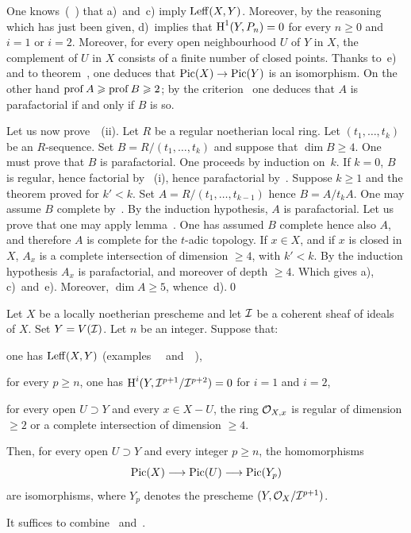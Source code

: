 One knows~(~) that a)~and~c) imply $\operatorname{Leff}(X, Y)$. Moreover, by the reasoning which has just been given, d)~implies that $\operatorname{H}^1(Y, P_n)=0$ for every $n\geq 0$ and $i=1$ or $i=2$. Moreover, for every open neighbourhood $U$ of $Y$ in $X$, the complement of $U$ in $X$ consists of a finite number of closed points. Thanks to~e) and to theorem~, one deduces that $\Pic(X)\to \Pic(Y)$ is an isomorphism. On the other hand $\operatorname{prof} A\geqslant \operatorname{prof} B\geqslant 2$; by the criterion~ one deduces that $A$ is parafactorial if and only if $B$ is so.

Let us now prove~~(ii). Let $R$ be a regular noetherian local ring. Let $(t_1, \ldots, t_k)$ be an $R$-sequence. Set $B=R/(t_1, \ldots, t_k)$ and suppose that $\dim B\geq 4$. One must prove that $B$ is parafactorial. One proceeds by induction on~$k$. If $k=0$, $B$ is regular, hence factorial by ~(i), hence parafactorial by~. Suppose $k\geq 1$ and the theorem proved for $k'<k$. Set $A=R/(t_1, \ldots, t_{k-1})$ hence $B=A/t_k A$. One may assume $B$ complete by~. By the induction hypothesis, $A$ is parafactorial. Let us prove that one may apply lemma~. One has assumed $B$ complete hence also $A$, and therefore $A$ is complete for the $t$-adic topology. If $x\in X$, and if $x$ is closed in $X$, $A_x$ is a complete intersection of dimension $\geq 4$, with $k'<k$. By the induction hypothesis $A_x$ is parafactorial, and moreover of depth $\geq 4$. Which gives a), c)~and~e). Moreover, $\dim A\geq 5$, whence~d).\qed

\begin{theorem} \label{XI.3.18}
Let $X$ be a locally noetherian prescheme and let ${\mathcal I}$ be a coherent sheaf of ideals of $X$. Set $Y=V({\mathcal I})$. Let $n$ be an integer. Suppose that:
\begin{enumeratei}
\item
one has $\operatorname{Leff}(X, Y)$ (\cf examples ~~and~~),
\item
for every $p\geq n$, one has $\operatorname{H}^i(Y, {\mathcal I}^{p+1}/{\mathcal I}^{p+2})=0$ for $i=1$ and $i=2$,
\item
for every open $U\supset Y$ and every $x\in X-U$, the ring $\mathcal{O}_{X, x}$ is regular of dimension $\geq 2$ or a complete intersection of dimension $\geq 4$.
\end{enumeratei}
\noindent
Then, for every open $U\supset Y$ and every integer $p\geq n$, the homomorphisms
\[
\Pic(X)\to\Pic(U)\to\Pic(Y_p)
\]
are isomorphisms, where $Y_p$ denotes the prescheme $(Y, \mathcal{O}_X/{\mathcal I}^{p+1})$.
\end{theorem}

It suffices to combine ~and~.
